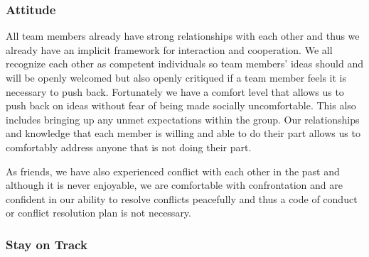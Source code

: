 \documentclass{article}
\begin{document}
\subsubsection*{Attitude}


\par{ All team members already have strong relationships with each other and thus we already have an implicit framework for interaction and cooperation.
We all recognize each other as competent individuals so team members' ideas should and will be openly welcomed but also openly critiqued if a team
member feels it is necessary to push back. Fortunately we have a comfort level that allows us to push back on ideas without fear of being made socially
uncomfortable. This also includes bringing up any unmet expectations within the group. Our relationships and knowledge that each member is willing
and able to do their part allows us to comfortably address anyone that is not doing their part. \newline\newline\indent

As friends, we have also experienced conflict with each other in the past and although it is never enjoyable, we are comfortable with confrontation
and are confident in our ability to resolve conflicts peacefully and thus a code of conduct or conflict resolution plan is not necessary.}

\subsubsection*{Stay on Track}



\end{document}
